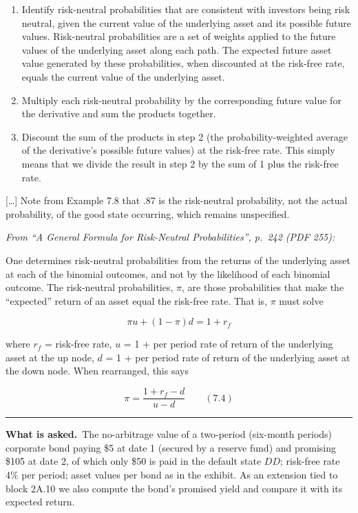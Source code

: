 \documentclass[11pt,a4paper]{article}
\newcommand{\asked}{\par\medskip\noindent\textbf{What is asked.}~}
\providecommand{\tightlist}{\setlength{\itemsep}{0pt}\setlength{\parskip}{0pt}}
\newcommand{\stmtend}{\par\endgroup\nopagebreak\noindent\rule{\linewidth}{0.4pt}\par\medskip}
\begin{document}
\begin{enumerate}
\def\labelenumi{\arabic{enumi}.}
\tightlist
\item
  Identify risk-neutral probabilities that are consistent with investors being risk neutral, given
  the current value of the underlying asset and its possible future values. Risk-neutral
  probabilities are a set of weights applied to the future values of the underlying asset along each
  path. The expected future asset value generated by these probabilities, when discounted at the
  risk-free rate, equals the current value of the underlying asset.
\item
  Multiply each risk-neutral probability by the corresponding future value for the derivative and
  sum the products together.
\item
  Discount the sum of the products in step 2 (the probability-weighted average of the derivative's
  possible future values) at the risk-free rate. This simply means that we divide the result in step
  2 by the sum of 1 plus the risk-free rate.
\end{enumerate}

{[}\ldots{]} Note from Example 7.8 that .87 is the risk-neutral probability, not the actual
probability, of the good state occurring, which remains unspecified.

\emph{From ``A General Formula for Risk-Neutral Probabilities'', p.~242 (PDF 255):}

One determines risk-neutral probabilities from the returns of the underlying asset at each of the
binomial outcomes, and not by the likelihood of each binomial outcome. The risk-neutral
probabilities, \(\pi\), are those probabilities that make the ``expected'' return of an asset equal
the risk-free rate. That is, \(\pi\) must solve

\[\pi u + (1-\pi) d = 1 + r_f\]

where \(r_f\) = risk-free rate, \(u\) = 1 + per period rate of return of the underlying asset at the
up node, \(d\) = 1 + per period rate of return of the underlying asset at the down node. When
rearranged, this says

\[\pi = \frac{1 + r_f - d}{u - d} \qquad (7.4)\]
\stmtend

\asked The no-arbitrage value of a two-period (six-month periods) corporate bond paying \$5 at date 1 (secured by a reserve fund) and
promising \$105 at date 2, of which only \$50 is paid in the default state $DD$; risk-free rate 4\% per period; asset values per bond
as in the exhibit. As an extension tied to block 2A.10 we also compute the bond's promised yield and compare it with its expected return.
\end{document}
